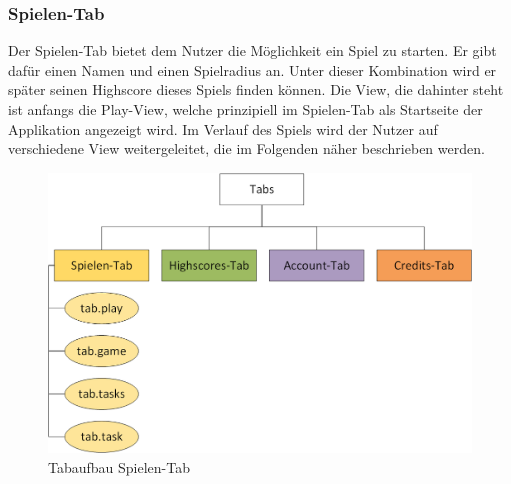 \subsubsection{Spielen-Tab}
Der Spielen-Tab bietet dem Nutzer die Möglichkeit ein Spiel zu starten. Er gibt dafür einen Namen und einen Spielradius an. Unter dieser Kombination wird er später seinen Highscore dieses Spiels finden können. Die View, die dahinter steht ist anfangs die Play-View, welche prinzipiell im Spielen-Tab als Startseite der Applikation angezeigt wird. Im Verlauf des Spiels wird der Nutzer auf verschiedene View weitergeleitet, die im Folgenden näher beschrieben werden. 
\begin{figure}[h]
\centering
\includegraphics[width=1\textwidth]{ref/images/tabs_spielen.png}
\caption[Tabaufbau Spielen-Tab]{Tabaufbau Spielen-Tab}
\label{fig:Tabaufbau Spielen-Tab}
\end{figure}

